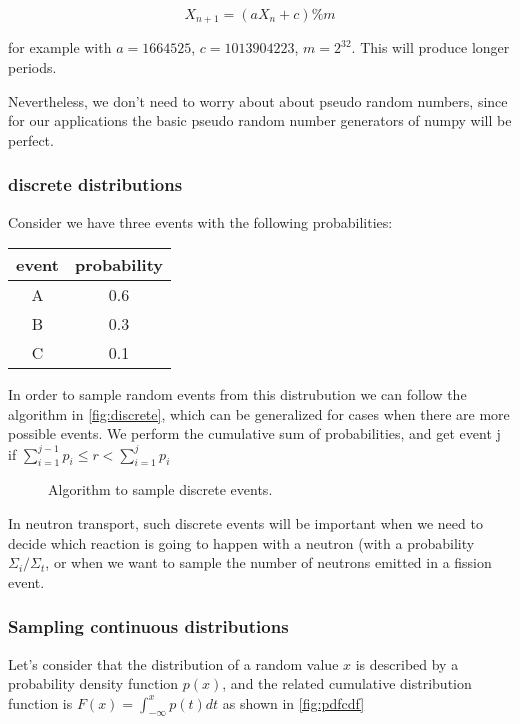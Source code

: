 \[
X_{n+1}=(aX_n+c)\%m
\]

\noindent for example with $a=1664525$, $c=1013904223$, $m=2^{32}$. This will produce longer periods.

Nevertheless, we don't need to worry about about pseudo random numbers, since for our applications the basic pseudo random number generators of numpy will be perfect.

\subsubsection{discrete distributions}

Consider we have three events with the following probabilities:


\begin{table}
\centering\begin{tabular}{c | c}
event & probability \\
\hline
A & 0.6 \\
B & 0.3 \\
C & 0.1 
\end{tabular}
\end{table}


In order to sample random events from this distrubution we can follow the algorithm in \autoref{fig:discrete}, which can be generalized for cases when there are more possible events. We perform the cumulative sum of probabilities, and get event j if $\sum_{i=1}^{j-1}p_i\leq r <\sum_{i=1}^{j}p_i$

\begin{figure}[ht!]
\protect {}\protect
\caption{\label{fig:discrete} \footnotesize{Algorithm to sample discrete events.}}
\end{figure}


In neutron transport, such discrete events will be important when we need to decide which reaction is going to happen with a neutron (with a probability $\Sigma_i/\Sigma_t$, or when we want to sample the number of neutrons emitted in a fission event. 

\subsubsection{Sampling continuous distributions}

Let's consider that the distribution of a random value $x$ is described by a probability density function $p(x)$, and the related cumulative distribution function is $F(x)=\int_{-\infty}^xp(t)dt$ as shown in \autoref{fig:pdfcdf}

